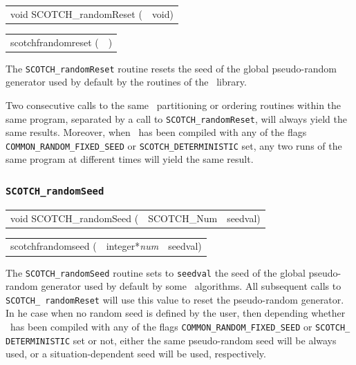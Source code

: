 \begin{itemize}
\progsyn

{\tt\begin{tabular}{l@{}l}
void SCOTCH\_randomReset ( & void)
\end{tabular}}

{\tt\begin{tabular}{l@{}l}
scotchfrandomreset ( & )
\end{tabular}}

\progdes

The {\tt SCOTCH\_randomReset} routine resets the seed of the
global pseudo-random generator used by default by the routines
of the \libscotch\ library.

Two consecutive calls to the same \libscotch\ partitioning or ordering
routines within the same program, separated by a call to
{\tt SCOTCH\_\lbt random\lbt Reset}, will always yield the same
results. Moreover, when \scotch\ has been compiled with any of the
flags {\tt COMMON\_\lbt RANDOM\_\lbt FIXED\_\lbt SEED} or
{\tt SCOTCH\_\lbt DETERMINISTIC} set, any two runs of the same program
at different times will yield the same result.

\end{itemize}

\subsubsection{{\tt SCOTCH\_randomSeed}}
\label{sec-lib-random-seed}

\begin{itemize}
\progsyn

{\tt\begin{tabular}{l@{}ll}
void SCOTCH\_randomSeed ( & SCOTCH\_Num & seedval)
\end{tabular}}

{\tt\begin{tabular}{l@{}ll}
scotchfrandomseed ( & integer*{\it num} & seedval)
\end{tabular}}

\progdes

The {\tt SCOTCH\_randomSeed} routine sets to {\tt seedval} the
seed of the global pseudo-random generator used by default by
some \scotch\ algorithms. All subsequent calls to {\tt SCOTCH\_\lbt
random\lbt Reset} will use this value to reset the pseudo-random
generator. In he case when no random seed is defined by the user, then
depending whether \scotch\ has been compiled with any of the flags
{\tt COMMON\_\lbt RANDOM\_\lbt FIXED\_\lbt SEED} or {\tt SCOTCH\_\lbt
DETERMINISTIC} set or not, either the same pseudo-random seed will be
always used, or a situation-dependent seed will be used,
respectively.
\end{itemize}

